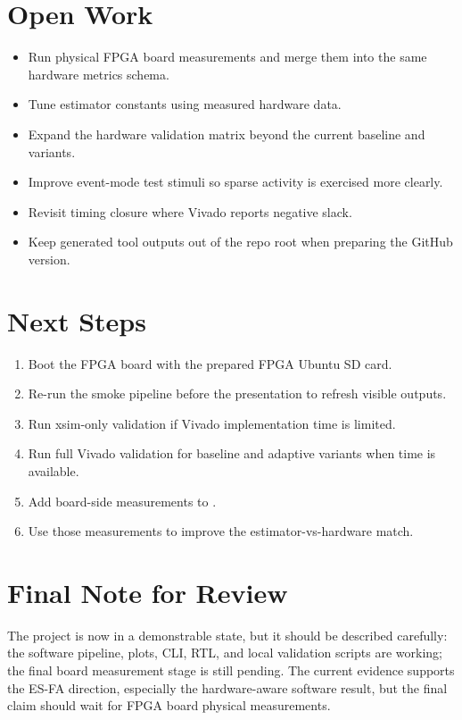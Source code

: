 \documentclass[11pt]{article}
\begin{document}
\section{Open Work}
\begin{itemize}[leftmargin=*]
\item Run physical FPGA board measurements and merge them into the same hardware
metrics schema.
\item Tune estimator constants using measured hardware data.
\item Expand the hardware validation matrix beyond the current baseline and
 variants.
\item Improve event-mode test stimuli so sparse activity is exercised more
clearly.
\item Revisit timing closure where Vivado reports negative slack.
\item Keep generated tool outputs out of the repo root when preparing the GitHub
version.
\end{itemize}

\section{Next Steps}
\begin{enumerate}[leftmargin=*]
\item Boot the FPGA board with the prepared FPGA Ubuntu SD card.
\item Re-run the smoke pipeline before the presentation to refresh visible
outputs.
\item Run xsim-only validation if Vivado implementation time is limited.
\item Run full Vivado validation for baseline and adaptive variants when time is
available.
\item Add board-side measurements to .
\item Use those measurements to improve the estimator-vs-hardware match.
\end{enumerate}

\section{Final Note for Review}
The project is now in a demonstrable state, but it should be described carefully:
the software pipeline, plots, CLI, RTL, and local validation scripts are working;
the final board measurement stage is still pending. The current evidence supports
the ES-FA direction, especially the hardware-aware software result, but the final
claim should wait for FPGA board physical measurements.
\end{document}
